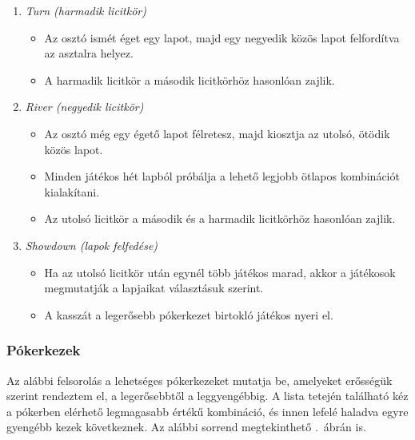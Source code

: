 \documentclass[]{thesis-ekf}
\theoremstyle{definition}
\theoremstyle{remark}
\begin{document}
\begin{enumerate}
\begin{itemize}
	\end{itemize}
	\item \emph{Turn (harmadik licitkör)}
	\begin{itemize}
		\item Az osztó ismét éget egy lapot, majd egy negyedik közös lapot felfordítva az asztalra helyez.
		\item A harmadik licitkör a második licitkörhöz hasonlóan zajlik.
	\end{itemize}
	\item \emph{River (negyedik licitkör)}
	\begin{itemize}
		\item Az osztó még egy égető lapot félretesz, majd kiosztja az utolsó, ötödik közös lapot.
		\item Minden játékos hét lapból próbálja a lehető legjobb ötlapos kombinációt kialakítani.
		\item Az utolsó licitkör a második és a harmadik licitkörhöz hasonlóan zajlik.
	\end{itemize}
	\item \emph{Showdown (lapok felfedése)}
	\begin{itemize}
		\item Ha az utolsó licitkör után egynél több játékos marad, akkor a játékosok megmutatják a lapjaikat választásuk szerint.
		\item A kasszát a legerősebb pókerkezet birtokló játékos nyeri el.
	\end{itemize}
\end{enumerate}

\subsubsection{Pókerkezek}

Az alábbi felsorolás a lehetséges pókerkezeket mutatja be, amelyeket erősségük szerint rendeztem el, a legerősebbtől a leggyengébbig. A lista tetején található kéz a pókerben elérhető legmagasabb értékű kombináció, és innen lefelé haladva egyre gyengébb kezek következnek. Az alábbi sorrend megtekinthető .~ábrán is. \cite[9.~oldal]{Szurdi}
\end{document}
